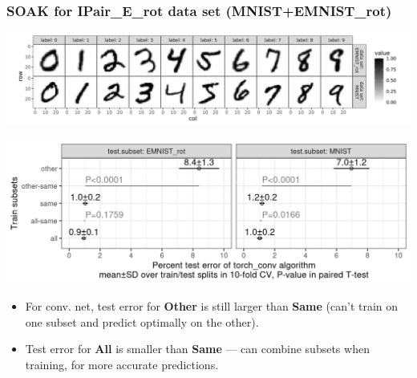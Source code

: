 \documentclass[t]{beamer}
\begin{document}
\begin{frame}
  \frametitle{SOAK for IPair\_E\_rot data set (MNIST+EMNIST\_rot)}

  \includegraphics[width=\textwidth]{data_Classif_MNIST_other_EMNIST_rot.png}

  \includegraphics[width=\textwidth]{conv_images_10fold_figure_pval}

  \begin{itemize}
  \item For conv. net, test error for \textbf{Other} is still larger than \textbf{Same} (can't train on one subset and predict optimally on the other).
  \item Test error for \textbf{All} is smaller than \textbf{Same} ---
    can combine subsets when training, for more accurate predictions.
  \end{itemize}
\end{frame}
\end{document}
